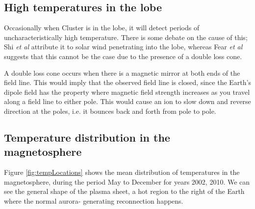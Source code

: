 \documentclass[12pt]{article}
\begin{document}
\subsection{High temperatures in the lobe}
Occasionally when Cluster is in the lobe, it will detect periods of uncharacteristically high temperature. There is some debate on the cause of this; Shi \textit{et al} \cite{Shi2013} attribute it to solar wind penetrating into the lobe, whereas Fear \textit{et al} \cite{Fear1506} suggests that this cannot be the case due to the presence of a double loss cone. 

A double loss cone occurs when there is a magnetic mirror at both ends of the field line. This would imply that the observed field line is closed, since the Earth's dipole field has the property where magnetic field strength increases as you travel along a field line to either pole. This would cause an ion to slow down and reverse direction at the poles, i.e. it bounces back and forth from pole to pole.



\subsection{Temperature distribution in the magnetosphere}
Figure \ref{fig:tempLocations} shows the mean distribution of temperatures in the magnetosphere, during the period May to December for years 2002, 2010. We can see the general shape of the plasma sheet, a hot region to the right of the Earth where the normal aurora- generating reconnection happens.
\end{document}
